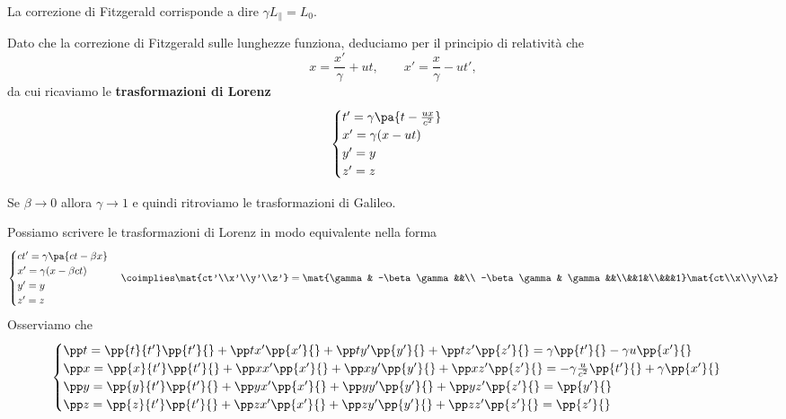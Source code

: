 \begin{remark}
La correzione di Fitzgerald corrisponde a dire $\gamma L_\parallel=L_0$. 
\end{remark}
\noindent Dato che la correzione di Fitzgerald sulle lunghezze funziona, deduciamo per il principio di relativit\`a che
\[x=\frac{x'}\gamma+ut,\qquad x'=\frac{x}\gamma-ut',\]
da cui ricaviamo le \textbf{trasformazioni di Lorenz}
\[\begin{cases}
t'=\gamma\pa{t-\frac{ux}{c^2}}\\
x'=\gamma (x-ut)\\
y'=y\\
z'=z
\end{cases}\]
\begin{remark}
Se $\beta\to 0$ allora $\gamma\to 1$ e quindi ritroviamo le trasformazioni di Galileo.
\end{remark}
\noindent
Possiamo scrivere le trasformazioni di Lorenz in modo equivalente nella forma
\[\begin{cases}
ct'=\gamma\pa{ct-\beta x}\\
x'=\gamma (x-\beta ct)\\
y'=y\\
z'=z
\end{cases}\coimplies\mat{ct'\\x'\\y'\\z'}=\mat{\gamma & -\beta\gamma &&\\ -\beta\gamma & \gamma &&\\&&1&\\&&&1}\mat{ct\\x\\y\\z}\]
\noindent Osserviamo che
\[\begin{cases}
\pp t{}=\pp {t}{t'}\pp{t'}{}+\pp t{x'}\pp {x'}{}+\pp t{y'}\pp {y'}{}+\pp t{z'}\pp {z'}{}=\gamma\pp{t'}{}-\gamma u\pp{x'}{}\\
\pp x{}=\pp {x}{t'}\pp{t'}{}+\pp x{x'}\pp {x'}{}+\pp x{y'}\pp {y'}{}+\pp x{z'}\pp {z'}{}=-\gamma \frac{u}{c^2}\pp{t'}{}+\gamma \pp{x'}{}\\
\pp y{}=\pp {y}{t'}\pp{t'}{}+\pp y{x'}\pp {x'}{}+\pp y{y'}\pp {y'}{}+\pp y{z'}\pp {z'}{}=\pp {y'}{}\\
\pp z{}=\pp {z}{t'}\pp{t'}{}+\pp z{x'}\pp {x'}{}+\pp z{y'}\pp {y'}{}+\pp z{z'}\pp {z'}{}=\pp {z'}{}
\end{cases}\]


